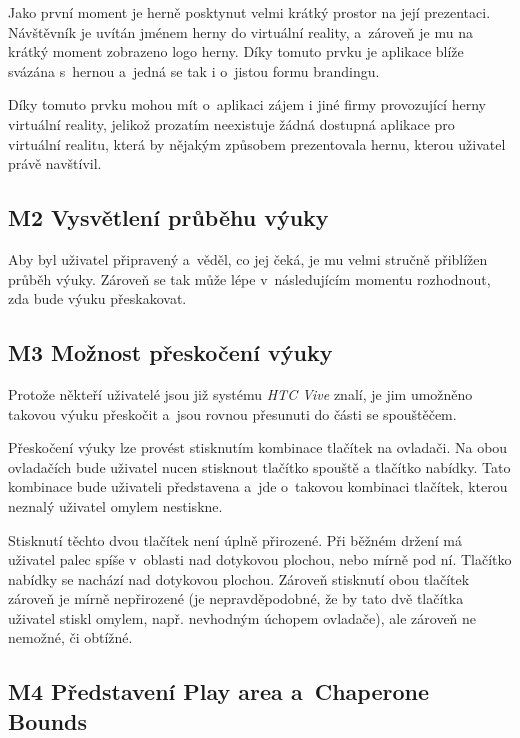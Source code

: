 Jako první moment je herně posktynut velmi krátký prostor na její
prezentaci. Návštěvník je uvítán jménem herny do virtuální
reality, a~zároveň je mu na krátký moment zobrazeno logo herny. Díky
tomuto prvku je aplikace blíže svázána s~hernou a~jedná se tak i
o~jistou formu brandingu.

Díky tomuto prvku mohou mít o~aplikaci zájem i jiné firmy provozující
herny virtuální reality, jelikož prozatím neexistuje žádná dostupná
aplikace pro virtuální realitu, která by nějakým způsobem prezentovala
hernu, kterou uživatel právě navštívil.

\subsection{M2 Vysvětlení průběhu
výuky}\label{m2-vysvux11btlenuxed-prux16fbux11bhu-vuxfduky}

Aby byl uživatel připravený a~věděl, co jej čeká, je mu velmi stručně
přiblížen průběh výuky. Zároveň se tak může lépe v~následujícím momentu
rozhodnout, zda bude výuku přeskakovat.

\subsection{M3 Možnost přeskočení
výuky}\label{m3-moux17enost-pux159eskoux10denuxed-vuxfduky}

Protože někteří uživatelé jsou již systému \emph{HTC Vive} znalí, je jim
umožněno takovou výuku přeskočit a~jsou rovnou přesunuti do části se
spouštěčem.

Přeskočení výuky lze provést stisknutím kombinace tlačítek na ovladači.
Na obou ovladačích bude uživatel nucen stisknout tlačítko spouště a
tlačítko nabídky. Tato kombinace bude uživateli představena a~jde
o~takovou kombinaci tlačítek, kterou neznalý uživatel omylem nestiskne.

Stisknutí těchto dvou tlačítek není úplně přirozené. Při běžném držení
má uživatel palec spíše v~oblasti nad dotykovou plochou, nebo mírně pod
ní. Tlačítko nabídky se nachází nad dotykovou plochou. Zároveň stisknutí
obou tlačítek zároveň je mírně nepřirozené (je nepravděpodobné, že by
tato dvě tlačítka uživatel stiskl omylem, např. nevhodným úchopem
ovladače), ale zároveň ne nemožné, či obtížné.

\subsection{M4 Představení Play area a~Chaperone
Bounds}\label{m4-pux159edstavenuxed-play-area-a-chaperone-bounds}


